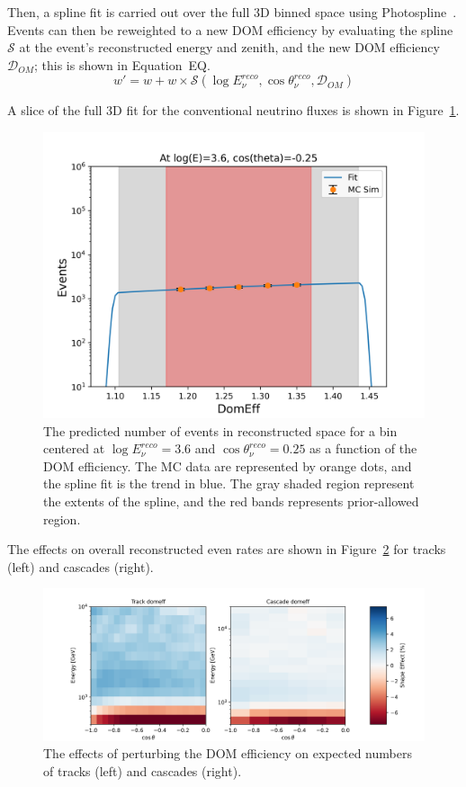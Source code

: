 \documentclass[main.tex]{subfiles}
\begin{document}
Then, a spline fit is carried out over the full 3D binned space using Photospline~\cite{WHITEHORN20132214}. 
Events can then be reweighted to a new DOM efficiency by evaluating the spline $\mathcal{S}$ at the event's reconstructed energy and zenith, and the new DOM efficiency $\mathcal{D}_{OM}$; this is shown in Equation~EQ.
\begin{equation}\label{eq:domeff}
    w' = w + w\times \mathcal{S}(\log E_{\nu}^{reco}, \cos\theta_{\nu}^{reco}, \mathcal{D}_{OM})
\end{equation}

A slice of the full 3D fit for the conventional neutrino fluxes is shown in Figure~\ref{fig:domeff_fit}.
\begin{figure}
    \centering
    \includegraphics[width=0.8\linewidth]{figures/atmConv_logE_3.6_cosz_-0.25.png}
    \caption{The predicted number of events in reconstructed space for a bin centered at $\log E_{\nu}^{reco}=3.6$ and $\cos\theta_{\nu}^{reco}=0.25$ as a function of the DOM efficiency. The MC data are represented by orange dots, and the spline fit is the trend in blue. The gray shaded region represent the extents of the spline, and the red bands represents prior-allowed region.}\label{fig:domeff_fit}
\end{figure}

The effects on overall reconstructed even rates are shown in Figure~\ref{fig:domeff_analysis} for tracks (left) and cascades (right). 

\begin{figure}
    \centering
    \includegraphics[width=0.8\linewidth]{figures/systematics/domeff.png}
    \caption{The effects of perturbing the DOM efficiency on expected numbers of tracks (left) and cascades (right).}\label{fig:domeff_analysis}
\end{figure}
\end{document}
